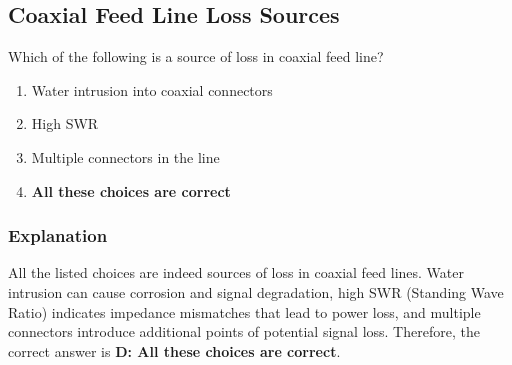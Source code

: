 \subsection{Coaxial Feed Line Loss Sources}
\label{T9B08}

\begin{tcolorbox}[colback=gray!10!white,colframe=black!75!black,title=T9B08]
Which of the following is a source of loss in coaxial feed line?
\begin{enumerate}[noitemsep]
    \item Water intrusion into coaxial connectors
    \item High SWR
    \item Multiple connectors in the line
    \item \textbf{All these choices are correct}
\end{enumerate}
\end{tcolorbox}

\subsubsection*{Explanation}
All the listed choices are indeed sources of loss in coaxial feed lines. Water intrusion can cause corrosion and signal degradation, high SWR (Standing Wave Ratio) indicates impedance mismatches that lead to power loss, and multiple connectors introduce additional points of potential signal loss. Therefore, the correct answer is \textbf{D: All these choices are correct}.